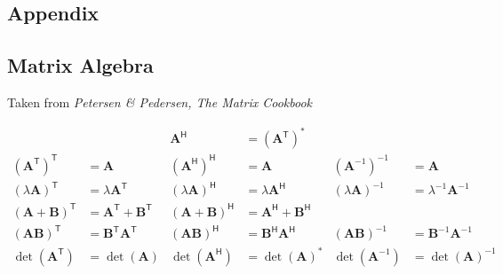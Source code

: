 \begin{multicols*}{3}
    \section{Appendix}
    
    \subsection{Matrix Algebra}
    Taken from \textit{Petersen \& Pedersen, The Matrix Cookbook}
    
    {\footnotesize
        \noindent\begin{align*}
                                                              &                                                 & \mathbf{A}^\mathsf{H}                             & = {\left(\mathbf{A}^\mathsf{T}\right)}^*     \\[.75em]
            {\left({\mathbf{A}}^\mathsf{T}\right)}^\mathsf{T} & = \mathbf{A}                                    & {\left({\mathbf{A}}^\mathsf{H}\right)}^\mathsf{H} & = \mathbf{A}                             & 
            {\left({\mathbf{A}}^{-1}\right)}^{-1}             & = \mathbf{A}                                                                                                                                       \\[.75em]
            {(\lambda\mathbf{A})}^\mathsf{T}                  & = \lambda\mathbf{A}^\mathsf{T}                  & 
            {(\lambda\mathbf{A})}^\mathsf{H}                  & = \lambda\mathbf{A}^\mathsf{H}                  & 
            {(\lambda\mathbf{A})}^{-1}                        & = \lambda^{-1}\mathbf{A}^{-1}                                                                                                                      \\[.75em]
            {\left(\mathbf{A}+\mathbf{B}\right)}^\mathsf{T}   & = \mathbf{A}^\mathsf{T} + \mathbf{B}^\mathsf{T} & 
            {\left(\mathbf{A}+\mathbf{B}\right)}^\mathsf{H}   & = \mathbf{A}^\mathsf{H} + \mathbf{B}^\mathsf{H}                                                                                                    \\[.75em]
            {\left(\mathbf{A}\mathbf{B}\right)}^\mathsf{T}    & = \mathbf{B}^\mathsf{T}\mathbf{A}^\mathsf{T}    & 
            {\left(\mathbf{A}\mathbf{B}\right)}^\mathsf{H}    & = \mathbf{B}^\mathsf{H}\mathbf{A}^\mathsf{H}    & 
            {\left(\mathbf{A}\mathbf{B}\right)}^{-1}          & = \mathbf{B}^{-1} \mathbf{A}^{-1}                                                                                                                  \\[.75em]
            \det(\mathbf{A}^\mathsf{T})                       & = \det(\mathbf{A})                              & 
            \det(\mathbf{A}^\mathsf{H})                       & = {\det(\mathbf{A})}^*                          & 
            \det(\mathbf{A}^{-1})                             & = {\det(\mathbf{A})}^{-1}                     
        \end{align*}
    }
    

\end{multicols*}
